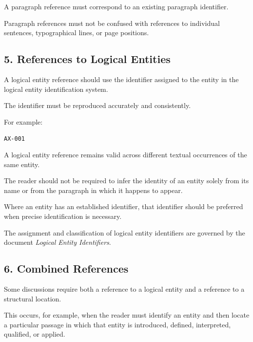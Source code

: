 A paragraph reference must correspond
to an existing paragraph identifier.

Paragraph references must not be confused
with references to individual sentences,
typographical lines, or page positions.


\subsection*{5. References to Logical Entities}

A logical entity reference should use
the identifier assigned to the entity
in the logical entity identification
system.

The identifier must be reproduced
accurately and consistently.

For example:

\begin{center}
    \texttt{AX-001}
\end{center}

A logical entity reference remains valid
across different textual occurrences
of the same entity.

The reader should not be required to
infer the identity of an entity solely
from its name or from the paragraph
in which it happens to appear.

Where an entity has an established
identifier, that identifier should
be preferred when precise identification
is necessary.

The assignment and classification
of logical entity identifiers are
governed by the document
\textit{Logical Entity Identifiers}.


\subsection*{6. Combined References}

Some discussions require both a reference
to a logical entity and a reference
to a structural location.

This occurs, for example, when the reader
must identify an entity and then locate
a particular passage in which that entity
is introduced, defined, interpreted,
qualified, or applied.

